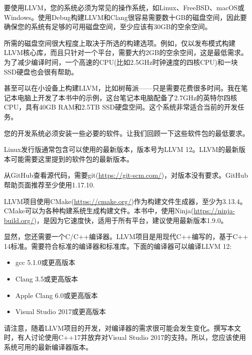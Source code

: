 要使用LLVM，您的系统必须为常见的操作系统，如Linux、FreeBSD、macOS或Windows。使用Debug构建LLVM和Clang很容易需要数十GB的磁盘空间，因此要确保您的系统有足够的可用磁盘空间，至少应该有30GB的空余空间。\par

所需的磁盘空间很大程度上取决于所选的构建选项。例如，仅以发布模式构建LLVM核心库，而且只针对一个平台，需要大约2GB的空余空间，这是最低需求。为了减少编译时间，一个高速的CPU(比如2.5GHz时钟速度的四核CPU)和一块SSD硬盘也会很有帮助。\par

甚至可以在小设备上构建LLVM，比如树莓派——只是需要花费很多时间。我在笔记本电脑上开发了本书中的示例，这台笔记本电脑配备了2.7GHz的英特尔四核CPU，具有40GB RAM和2.5TB SSD硬盘空间。这个系统非常适合当前的开发任务。\par

您的开发系统必须安装一些必要的软件。让我们回顾一下这些软件包的最低要求。\par

\begin{tcolorbox}[colback=blue!5!white,colframe=blue!75!black, title=Note]
Linux发行版通常包含可以使用的最新版本，版本号为LLVM 12。LLVM的最新版本可能需要这里提到的软件包的最新版本。
\end{tcolorbox}

从GitHub查看源代码，需要git(\url{https://git-scm.com/})，对版本没有要求。GitHub帮助页面推荐至少使用1.17.10.\par

LLVM项目使用CMake(\url{https://cmake.org/})作为构建文件生成器，至少为3.13.4。CMake可以为各种构建系统生成构建文件。本书中，使用Ninja(\url{https://ninja-build.org/})，是因为它速度快，适用于所有平台，建议使用最新版本1.9.0。\par

显然，您还需要一个C/C++编译器。LLVM项目是用现代C++编写的，基于C++ 14标准。需要符合标准的编译器和标准库。下面的编译器可以编译LLVM 12:\par

\begin{itemize}
	\item gcc 5.1.0或更高版本
	\item Clang 3.5或更高版本
	\item Apple Clang 6.0或更高版本
	\item Visual Studio 2017或更高版本
\end{itemize}

请注意，随着LLVM项目的开发，对编译器的需求很可能会发生变化。撰写本文时，有人讨论使用C++17并放弃对Visual Studio 2017的支持。所以，您应该使用系统可用的最新编译器版本。\par

